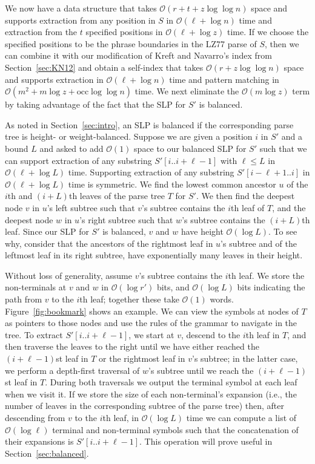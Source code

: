 \documentclass[review]{elsarticle}
\newcommand{\Oh}[1]
    {\ensuremath{\mathcal{O}\!\left( {#1} \right)}}
\newcommand{\occ}
    {\ensuremath{\mathrm{occ}}}
\begin{document}
We now have a data structure that takes $\Oh{r + t + z \log \log n}$ space and supports extraction from any position in $S$ in $\Oh{\ell + \log n}$ time and extraction from the $t$ specified positions in $\Oh{\ell + \log z}$ time.  If we choose the specified positions to be the phrase boundaries in the LZ77 parse of $S$, then we can combine it with our modification of Kreft and Navarro's index from Section~\ref{sec:KN12} and obtain a self-index that takes $\Oh{r + z \log \log n}$ space and supports extraction in $\Oh{\ell + \log n}$ time and pattern matching in $\Oh{m^2 + m \log z + \occ \log \log n}$ time.  We next eliminate the $\Oh{m \log z}$ term by taking advantage of the fact that the SLP for $S'$ is balanced.

As noted in Section~\ref{sec:intro}, an SLP is balanced if the corresponding parse tree is height- or weight-balanced.  Suppose we are given a position $i$ in $S'$ and a bound $L$ and asked to add $\Oh{1}$ space to our balanced SLP for $S'$ such that we can support extraction of any substring \(S' [i..i + \ell - 1]\) with \(\ell \leq L\) in $\Oh{\ell + \log L}$ time.  Supporting extraction of any substring \(S' [i - \ell + 1..i]\) in $\Oh{\ell + \log L}$ time is symmetric.  We find the lowest common ancestor $u$ of the $i$th and \((i + L)\)th leaves of the parse tree $T$ for $S'$.  We then find the deepest node $v$ in $u$'s left subtree such that $v$'s subtree contains the $i$th leaf of $T$, and the deepest node $w$ in $u$'s right subtree such that $w$'s subtree contains the \((i + L)\)th leaf.  Since our SLP for $S'$ is balanced, $v$ and $w$ have height $\Oh{\log L}$.  To see why, consider that the ancestors of the rightmost leaf in $u$'s subtree and of the leftmost leaf in its right subtree, have exponentially many leaves in their height.

Without loss of generality, assume $v$'s subtree contains the $i$th leaf.  We store the non-terminals at $v$ and $w$ in $\Oh{\log r'}$ bits, and $\Oh{\log L}$ bits indicating the path from $v$ to the $i$th leaf; together these take $\Oh{1}$ words.  Figure~\ref{fig:bookmark} shows an example.  We can view the symbols at nodes of $T$ as pointers to those nodes and use the rules of the grammar to navigate in the tree.  To extract \(S' [i..i + \ell - 1]\), we start at $v$, descend to the $i$th leaf in $T$, and then traverse the leaves to the right until we have either reached the \((i + \ell - 1)\)st leaf in $T$ or the rightmost leaf in $v$'s subtree; in the latter case, we perform a depth-first traversal of $w$'s subtree until we reach the \((i + \ell - 1)\)st leaf in $T$.  During both traversals we output the terminal symbol at each leaf when we visit it.  If we store the size of each non-terminal's expansion (i.e., the number of leaves in the corresponding subtree of the parse tree) then, after descending from $v$ to the $i$th leaf, in $\Oh{\log L}$ time we can compute a list of $\Oh{\log \ell}$ terminal and non-terminal symbols such that the concatenation of their expansions is \(S' [i..i + \ell - 1]\).  This operation will prove useful in Section~\ref{sec:balanced}.
\end{document}
